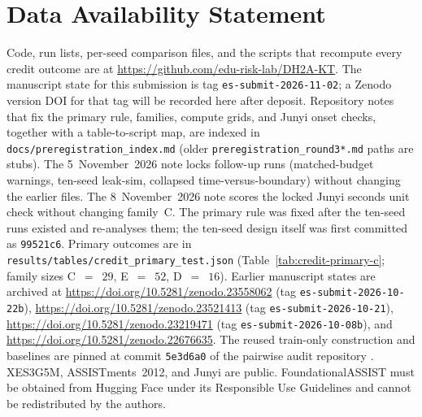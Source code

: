 \documentclass[review,12pt]{elsarticle}
\begin{document}
\section*{Data Availability Statement}
Code, run lists, per-seed comparison files, and the scripts that
recompute every credit outcome are at
\url{https://github.com/edu-risk-lab/DH2A-KT}. The manuscript state for
this submission is tag \texttt{es-submit-2026-11-02}; a Zenodo version
DOI for that tag will be recorded here after deposit. Repository notes
that fix the primary rule, families, compute grids, and Junyi onset
checks, together with a table-to-script map, are indexed in
\texttt{docs/preregistration\_index.md} (older
\texttt{preregistration\_round3*.md} paths are stubs). The 5~November~2026
note locks follow-up runs (matched-budget warnings, ten-seed leak-sim,
collapsed time-versus-boundary) without changing the earlier files.
The 8~November~2026 note scores the locked Junyi seconds unit check
without changing family~C.
The primary rule
was fixed after the ten-seed runs existed and re-analyses them; the
ten-seed design itself was first committed as \texttt{99521c6}. Primary
outcomes are in \texttt{results/tables/credit\_primary\_test.json}
(Table~\ref{tab:credit-primary-c}; family sizes C~$=$~$29$, E~$=$~$52$,
D~$=$~$16$). Earlier manuscript states are
archived at \url{https://doi.org/10.5281/zenodo.23558062}
(tag \texttt{es-submit-2026-10-22b}),
\url{https://doi.org/10.5281/zenodo.23521413}
(tag \texttt{es-submit-2026-10-21}),
\url{https://doi.org/10.5281/zenodo.23219471}
(tag \texttt{es-submit-2026-10-08b}), and
\url{https://doi.org/10.5281/zenodo.22676635}. The reused
train-only construction and baselines are pinned at commit
\texttt{5e3d6a0} of the pairwise audit repository \cite{daominh2026p0}.
XES3G5M, ASSISTments~2012, and Junyi are public. FoundationalASSIST
\cite{foundationalassist2026} must be obtained from Hugging Face under
its Responsible Use Guidelines and cannot be redistributed by the
authors.

\FloatBarrier



\end{document}
